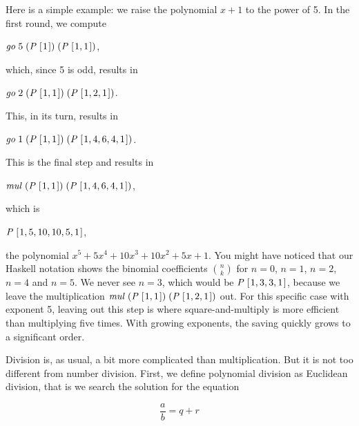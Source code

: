 \documentclass[tikz]{scrreprt}
\newcommand{\Conid}[1]{\mathit{#1}}
\newcommand{\Varid}[1]{\mathit{#1}}
\begin{document}
Here is a simple example: we raise the polynomial
$x + 1$ to the power of 5. In the first round, we compute

\ensuremath{\Varid{go}\;\mathrm{5}\;(\Conid{P}\;[\mskip1.5mu \mathrm{1}\mskip1.5mu])\;(\Conid{P}\;[\mskip1.5mu \mathrm{1},\mathrm{1}\mskip1.5mu])},

which, since 5 is odd, results in 

\ensuremath{\Varid{go}\;\mathrm{2}\;(\Conid{P}\;[\mskip1.5mu \mathrm{1},\mathrm{1}\mskip1.5mu])\;(\Conid{P}\;[\mskip1.5mu \mathrm{1},\mathrm{2},\mathrm{1}\mskip1.5mu])}.

This, in its turn, results in

\ensuremath{\Varid{go}\;\mathrm{1}\;(\Conid{P}\;[\mskip1.5mu \mathrm{1},\mathrm{1}\mskip1.5mu])\;(\Conid{P}\;[\mskip1.5mu \mathrm{1},\mathrm{4},\mathrm{6},\mathrm{4},\mathrm{1}\mskip1.5mu])}.

This is the final step and results in 

\ensuremath{\Varid{mul}\;(\Conid{P}\;[\mskip1.5mu \mathrm{1},\mathrm{1}\mskip1.5mu])\;(\Conid{P}\;[\mskip1.5mu \mathrm{1},\mathrm{4},\mathrm{6},\mathrm{4},\mathrm{1}\mskip1.5mu])}, 

which is

\ensuremath{\Conid{P}\;[\mskip1.5mu \mathrm{1},\mathrm{5},\mathrm{10},\mathrm{10},\mathrm{5},\mathrm{1}\mskip1.5mu]},

the polynomial $x^5 + 5x^4 + 10x^3 + 10x^2 + 5x + 1$.
You might have noticed that our Haskell notation
shows the binomial coefficients $\binom{n}{k}$ for
$n=0$, $n=1$, $n=2$, $n=4$ and $n=5$.
We never see $n=3$, which would be 
\ensuremath{\Conid{P}\;[\mskip1.5mu \mathrm{1},\mathrm{3},\mathrm{3},\mathrm{1}\mskip1.5mu]}, because we leave the multiplication
\ensuremath{\Varid{mul}\;(\Conid{P}\;[\mskip1.5mu \mathrm{1},\mathrm{1}\mskip1.5mu])\;(\Conid{P}\;[\mskip1.5mu \mathrm{1},\mathrm{2},\mathrm{1}\mskip1.5mu])} out.
For this specific case with exponent 5,
leaving out this step is where square-and-multiply
is more efficient than multiplying five times.
With growing exponents, the saving quickly grows
to a significant order.

Division is, as usual, a bit more complicated than multiplication.
But it is not too different from number division. First,
we define polynomial division as Euclidean division, that is
we search the solution for the equation

\begin{equation}
\frac{a}{b} = q + r
\end{equation}
\end{document}
